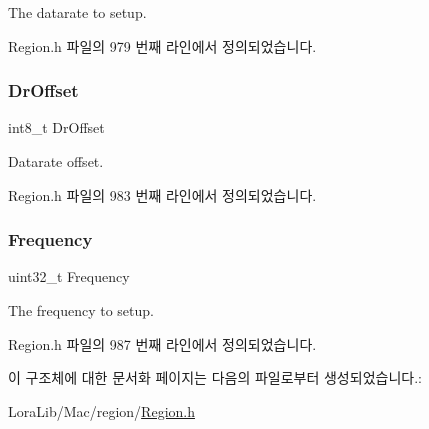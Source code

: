 The datarate to setup. 

Region.\+h 파일의 979 번째 라인에서 정의되었습니다.

\mbox{\label{structs_rx_param_setup_req_params_ad920e18a48423b1eb1fe40d1b2b082d4}} 
\subsubsection{\texorpdfstring{Dr\+Offset}{DrOffset}}
{\footnotesize\ttfamily int8\+\_\+t Dr\+Offset}

Datarate offset. 

Region.\+h 파일의 983 번째 라인에서 정의되었습니다.

\mbox{\label{structs_rx_param_setup_req_params_ade3d190636488dad9a89b19446b7acf1}} 
\subsubsection{\texorpdfstring{Frequency}{Frequency}}
{\footnotesize\ttfamily uint32\+\_\+t Frequency}

The frequency to setup. 

Region.\+h 파일의 987 번째 라인에서 정의되었습니다.



이 구조체에 대한 문서화 페이지는 다음의 파일로부터 생성되었습니다.\+:\begin{DoxyCompactItemize}
\item 
Lora\+Lib/\+Mac/region/\mbox{\hyperlink{_region_8h}{Region.\+h}}\end{DoxyCompactItemize}
